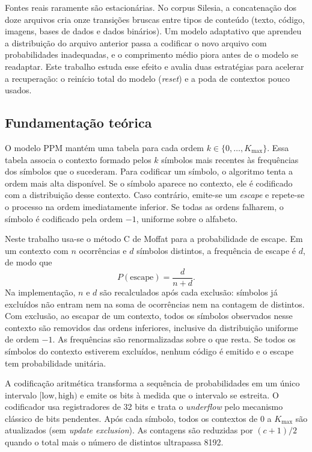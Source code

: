\documentclass[12pt,a4paper]{article}
\begin{document}
Fontes reais raramente s\~ao estacion\'arias. No corpus Silesia, a concatena\c{c}\~ao
dos doze arquivos cria onze transi\c{c}\~oes bruscas entre tipos de conte\'udo
(texto, c\'odigo, imagens, bases de dados e dados bin\'arios). Um modelo adaptativo
que aprendeu a distribui\c{c}\~ao do arquivo anterior passa a codificar o novo
arquivo com probabilidades inadequadas, e o comprimento m\'edio piora antes de o
modelo se readaptar. Este trabalho estuda esse efeito e avalia duas estrat\'egias
para acelerar a recupera\c{c}\~ao: o rein\'icio total do modelo (\emph{reset}) e a
poda de contextos pouco usados.

\subsection{Fundamenta\c{c}\~ao te\'orica}
O modelo PPM mant\'em uma tabela para cada ordem
$k \in \{0,\ldots,K_{\max}\}$. Essa tabela associa o contexto formado pelos $k$
s\'imbolos mais recentes \`as frequ\^encias dos s\'imbolos que o sucederam. Para
codificar um s\'imbolo, o algoritmo tenta a ordem mais alta dispon\'ivel. Se o
s\'imbolo aparece no contexto, ele \'e codificado com a distribui\c{c}\~ao desse
contexto. Caso contr\'ario, emite-se um \emph{escape} e repete-se o processo na
ordem imediatamente inferior. Se todas as ordens falharem, o s\'imbolo \'e
codificado pela ordem $-1$, uniforme sobre o alfabeto.

Neste trabalho usa-se o m\'etodo C de Moffat para a probabilidade de escape. Em um
contexto com $n$ ocorr\^encias e $d$ s\'imbolos distintos, a frequ\^encia de escape
\'e $d$, de modo que
\begin{equation}
  P(\text{escape}) = \frac{d}{n+d}.
\end{equation}
Na implementa\c{c}\~ao, $n$ e $d$ s\~ao recalculados ap\'os cada exclus\~ao:
s\'imbolos j\'a exclu\'idos n\~ao entram nem na soma de ocorr\^encias nem na
contagem de distintos. Com exclus\~ao, ao escapar de um contexto, todos os
s\'imbolos observados nesse contexto s\~ao removidos das ordens inferiores,
inclusive da distribui\c{c}\~ao uniforme de ordem $-1$. As frequ\^encias s\~ao
renormalizadas sobre o que resta. Se todos os s\'imbolos do contexto estiverem
exclu\'idos, nenhum c\'odigo \'e emitido e o escape tem probabilidade unit\'aria.

A codifica\c{c}\~ao aritm\'etica transforma a sequ\^encia de probabilidades em um
\'unico intervalo $[\text{low},\text{high})$ e emite os bits \`a medida que o
intervalo se estreita. O codificador usa registradores de 32 bits e trata o
\emph{underflow} pelo mecanismo cl\'assico de bits pendentes. Ap\'os cada s\'imbolo,
todos os contextos de $0$ a $K_{\max}$ s\~ao atualizados (sem \emph{update
exclusion}). As contagens s\~ao reduzidas por $(c+1)/2$ quando o total mais o
n\'umero de distintos ultrapassa 8192.
\end{document}
